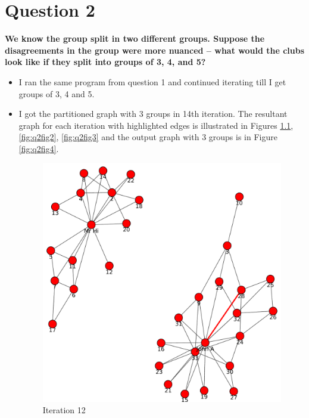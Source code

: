 \chapter{Question 2}
\label{avoiding-uri-aliases}

\textbf{ We know the group split in two different groups.  Suppose the disagreements in the group were more nuanced -- what would the clubs look like if they split into groups of 3, 4, and 5?}

\begin{itemize}
\item I ran the same program from question 1 and continued iterating till I get groups of 3, 4 and 5.
\newpage
\item I got the partitioned graph with 3 groups in 14th iteration. The resultant graph for each iteration with highlighted edges is illustrated in Figures \ref{fig:q2fig1}, \ref{fig:q2fig2}, \ref{fig:q2fig3} and the output graph with 3 groups is in Figure \ref{fig:q2fig4}.
\begin{figure}[h!]
\begin{center}
\includegraphics[scale=0.55, keepaspectratio=true]{figures/graphs/EdgeHighlightedGraph12.pdf}
\caption{Iteration 12}
\label{fig:q2fig1}
\end{center}
\end{figure}
\newpage
\begin{figure}[h!]

\end{figure}
\end{itemize}
